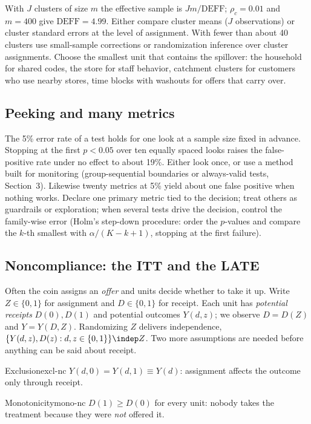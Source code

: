 \documentclass[11pt]{article}
\begin{document}
With $J$ clusters of size $m$ the effective sample is $Jm/\text{DEFF}$; $\rho_c = 0.01$ and $m = 400$ give
$\text{DEFF} = 4.99$. Either compare cluster means ($J$ observations) or cluster standard errors at the level
of assignment. With fewer than about 40 clusters use small-sample corrections or randomization inference over
cluster assignments. Choose the smallest unit that contains the spillover: the household for shared codes,
the store for staff behavior, catchment clusters for customers who use nearby stores, time blocks with
washouts for offers that carry over.

\subsection{Peeking and many metrics}

The 5\% error rate of a test holds for one look at a sample size fixed in advance. Stopping at the first
$p < 0.05$ over ten equally spaced looks raises the false-positive rate under no effect to about 19\%.
Either look once, or use a method built for monitoring (group-sequential boundaries or always-valid tests,
Section~3). Likewise twenty metrics at 5\% yield about one false positive when nothing works. Declare one
primary metric tied to the decision; treat others as guardrails or exploration; when several tests drive the
decision, control the family-wise error (Holm's step-down procedure: order the $p$-values and compare the
$k$-th smallest with $\alpha/(K - k + 1)$, stopping at the first failure).

\subsection{Noncompliance: the ITT and the LATE}\label{sec:noncompliance}

Often the coin assigns an \emph{offer} and units decide whether to take it up. Write $Z \in \{0,1\}$ for
assignment and $D \in \{0,1\}$ for receipt. Each unit has \emph{potential receipts} $D(0), D(1)$ and potential
outcomes $Y(d, z)$; we observe $D = D(Z)$ and $Y = Y(D, Z)$. Randomizing $Z$ delivers independence,
$\{Y(d,z), D(z) : d, z \in \{0,1\}\} \indep Z$. Two more assumptions are needed before anything can be said
about receipt.

\begin{assum}{Exclusion}{excl-nc}
$Y(d, 0) = Y(d, 1) \equiv Y(d)$: assignment affects the outcome only through receipt.
\end{assum}
\begin{assum}{Monotonicity}{mono-nc}
$D(1) \ge D(0)$ for every unit: nobody takes the treatment because they were \emph{not} offered it.
\end{assum}
\end{document}
